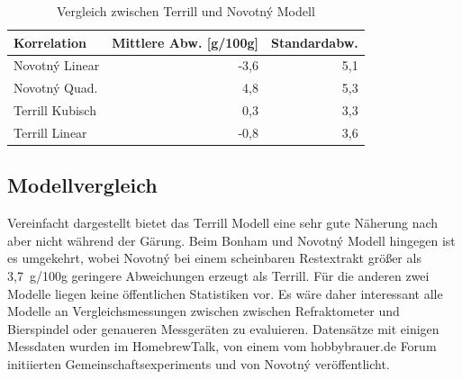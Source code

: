 \documentclass[a4paper,parskip=half]{scrartcl}
\begin{document}
\begin{table}[h]
\centering
\begin{tabular}{lrr}
\toprule
Korrelation &  Mittlere Abw. [g/100g] &  Standardabw. \\
\midrule
Novotný Linear & -3,6 & 5,1 \\
Novotný Quad. & 4,8 & 5,3  \\
Terrill Kubisch & 0,3 & 3,3 \\
Terrill Linear & -0,8 & 3,6 \\
\bottomrule
\end{tabular}
\caption{Vergleich zwischen Terrill und Novotný Modell}
\label{table:terrillnovotnycomp}
\end{table}

\subsection*{Modellvergleich}

Vereinfacht dargestellt bietet das Terrill Modell eine sehr gute Näherung
nach aber nicht während der Gärung. Beim Bonham und Novotný Modell
hingegen ist es umgekehrt, wobei Novotný bei einem scheinbaren
Restextrakt größer als 3,7~g/100g geringere Abweichungen erzeugt als
Terrill. Für die anderen zwei Modelle liegen keine öffentlichen
Statistiken vor. Es wäre daher interessant alle Modelle an
Vergleichsmessungen zwischen zwischen Refraktometer und Bierspindel
oder genaueren Messgeräten zu evaluieren. Datensätze mit einigen
Messdaten wurden im HomebrewTalk, von einem vom hobbybrauer.de Forum
initiierten Gemeinschaftsexperiments und von Novotný veröffentlicht.
\autocite{Katman2019,Novotny2017a,Wolf2015}
\end{document}
